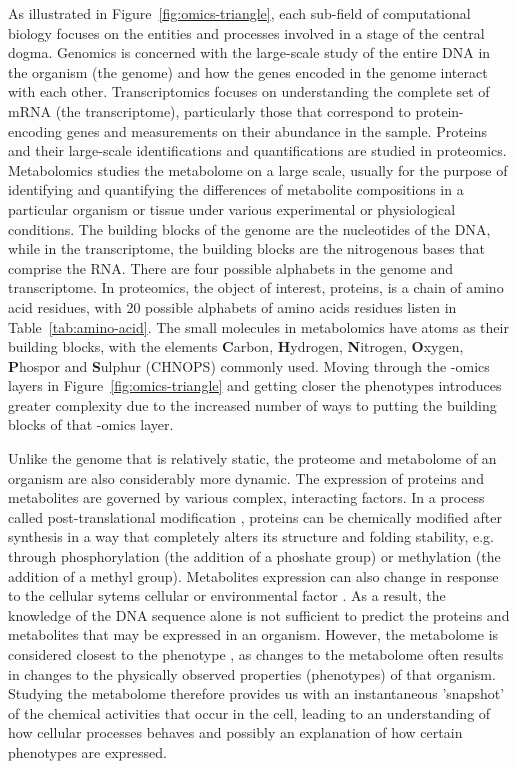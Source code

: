 As illustrated in Figure~\ref{fig:omics-triangle}, each sub-field of computational biology focuses on the entities and processes involved in a stage of the central dogma. Genomics is concerned with the large-scale study of the entire DNA in the organism (the genome) and how the genes encoded in the genome interact with each other. Transcriptomics focuses on understanding the complete set of mRNA (the transcriptome), particularly those that correspond to protein-encoding genes and measurements on their abundance in the sample. Proteins and their large-scale identifications and quantifications are studied in proteomics. Metabolomics studies the metabolome on a large scale, usually for the purpose of identifying and quantifying the differences of metabolite compositions in a particular organism or tissue under various experimental or physiological conditions. The building blocks of the genome are the nucleotides of the DNA, while in the transcriptome, the building blocks are the nitrogenous bases that comprise the RNA. There are four possible alphabets in the genome and transcriptome. In proteomics, the object of interest, proteins, is a chain of amino acid residues, with 20 possible alphabets of amino acids residues listen in Table~\ref{tab:amino-acid}. The small molecules in metabolomics have atoms as their building blocks, with the elements \textbf{C}arbon, \textbf{H}ydrogen, \textbf{N}itrogen, \textbf{O}xygen, \textbf{P}hospor and \textbf{S}ulphur (CHNOPS) commonly used. Moving through the -omics layers in Figure~\ref{fig:omics-triangle} and getting closer the phenotypes introduces greater complexity due to the increased number of ways to putting the building blocks of that -omics layer. 

Unlike the genome that is relatively static, the proteome and metabolome of an organism are also considerably more dynamic. The expression of proteins and metabolites are governed by various complex, interacting factors. In a process called post-translational modification \cite{mann2003proteomic}, proteins can be chemically modified after synthesis in a way that completely alters its structure and folding stability, e.g. through phosphorylation (the addition of a phoshate group) or methylation (the addition of a methyl group). Metabolites expression can also change in response to the cellular sytems cellular \cite{Panopoulos2012} or environmental factor \cite{Hirai2004}. As a result, the knowledge of the DNA sequence alone is not sufficient to predict the proteins and metabolites that may be expressed in an organism. However, the metabolome is considered closest to the phenotype \cite{Fiehn2002}, as changes to the metabolome often results in changes to the physically observed properties (phenotypes) of that organism. Studying the metabolome therefore provides us with an instantaneous 'snapshot' of the chemical activities that occur in the cell, leading to an understanding of how cellular processes behaves and possibly an explanation of how certain phenotypes are expressed.

